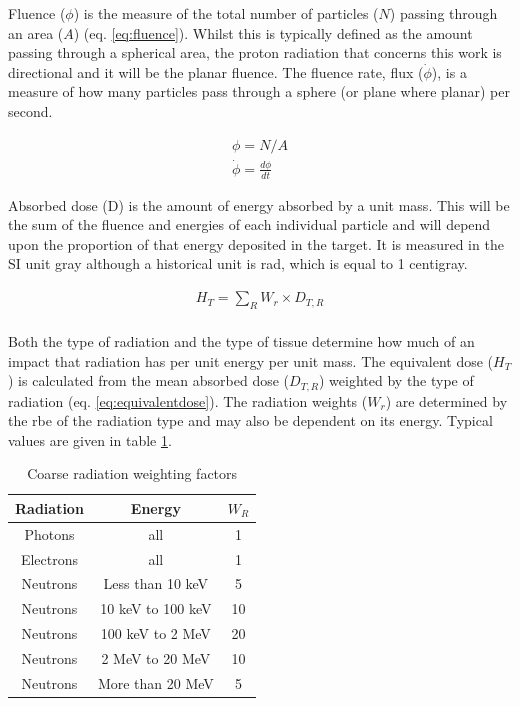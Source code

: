 Fluence ($\phi$) is the measure of the total number of particles ($N$) passing through an area ($A$) (eq. \ref{eq:fluence}).  Whilst this is typically defined as the amount passing through a spherical area, the proton radiation that concerns this work is directional and it will be the planar fluence\cite{dosimetrygreening}.  The fluence rate, flux ($\dot{\phi}$), is a measure of how many particles pass through a sphere (or plane where planar) per second.

\begin{equation}
\begin{split}
\phi = N/A \\
\dot{\phi} = \frac{d\phi}{dt} 
\label{eq:fluence}
\end{split}
\end{equation}

Absorbed dose (D) is the amount of energy absorbed by a unit mass.  This will be the sum of the fluence and energies of each individual particle and will depend upon the proportion of that energy deposited in the target.  It is measured in the SI unit \gls{gray} although a historical unit is \gls{rad}, which is equal to 1 centigray.

\begin{equation}
\begin{split}
H_T = \sum_R W_{r} \times D_{T,R} \\
\label{eq:equivalentdose}
\end{split}
\end{equation}

Both the type of radiation and the type of tissue determine how much of an impact that radiation has per unit energy per unit mass.  The equivalent dose ($H_T$) is calculated from the mean absorbed dose ($D_{T,R}$) weighted by the type of radiation (eq. \ref{eq:equivalentdose}\cite{icrp103}).  The radiation weights ($W_{r}$) are determined by the \acrfull{rbe} of the radiation type and may also be dependent on its energy.  Typical values are given in table \ref{table:radiationweighting}\cite{radiationweighting}.

\begin{table}[h]
\begin{center}
\renewcommand{\arraystretch}{1.2}
\begin{tabular}{c c c}
\hline\hline
Radiation & Energy & $W_R$ \\
\hline\hline
Photons & all & 1\\
Electrons & all & 1\\
Neutrons & Less than 10 keV & 5 \\
Neutrons & 10 keV to 100 keV & 10 \\
Neutrons & 100 keV to 2 MeV & 20 \\
Neutrons & 2 MeV to 20 MeV & 10 \\
Neutrons & More than 20 MeV & 5 \\
\hline\hline
\end{tabular}
\end{center}
\caption{Coarse radiation weighting factors\cite{radiationweighting}}
\label{table:radiationweighting}
\end{table}

